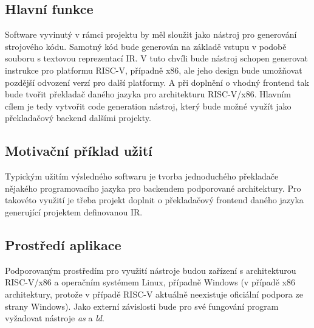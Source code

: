 \documentclass{article}
\def\xxx#1{\textcolor{red!50}{\itshape #1}}
\begin{document}

\subsection{Hlavní funkce}

Software vyvinutý v rámci projektu by měl sloužit jako nástroj pro generování strojového kódu. Samotný kód bude generován na základě vstupu v podobě souboru s textovou reprezentací IR. V tuto chvíli bude nástroj schopen generovat instrukce pro platformu RISC-V, případně x86, ale jeho design bude umožňovat pozdější odvození verzí pro další platformy. A při doplnění o vhodný frontend tak bude tvořit překladač daného jazyka pro architekturu RISC-V/x86. Hlavním cílem je tedy vytvořit code generation nástroj, který bude možné využít jako překladačový backend dalšími projekty.

\subsection{Motivační příklad užití}

Typickým užitím výsledného softwaru je tvorba jednoduchého překladače nějakého programovacího jazyka pro backendem podporované architektury. Pro takovéto využití je třeba projekt doplnit o překladačový frontend daného jazyka generující projektem definovanou IR. 


\subsection{Prostředí aplikace}

Podporovaným prostředím pro využití nástroje budou zařízení s architekturou RISC-V/x86 a operačním systémem Linux, případně Windows (v případě x86 architektury, protože v případě RISC-V aktuálně neexistuje oficiální podpora ze strany Windows). Jako externí závislosti bude pro své fungování program vyžadovat nástroje \textit{as} a \textit{ld}. 
\end{document}
